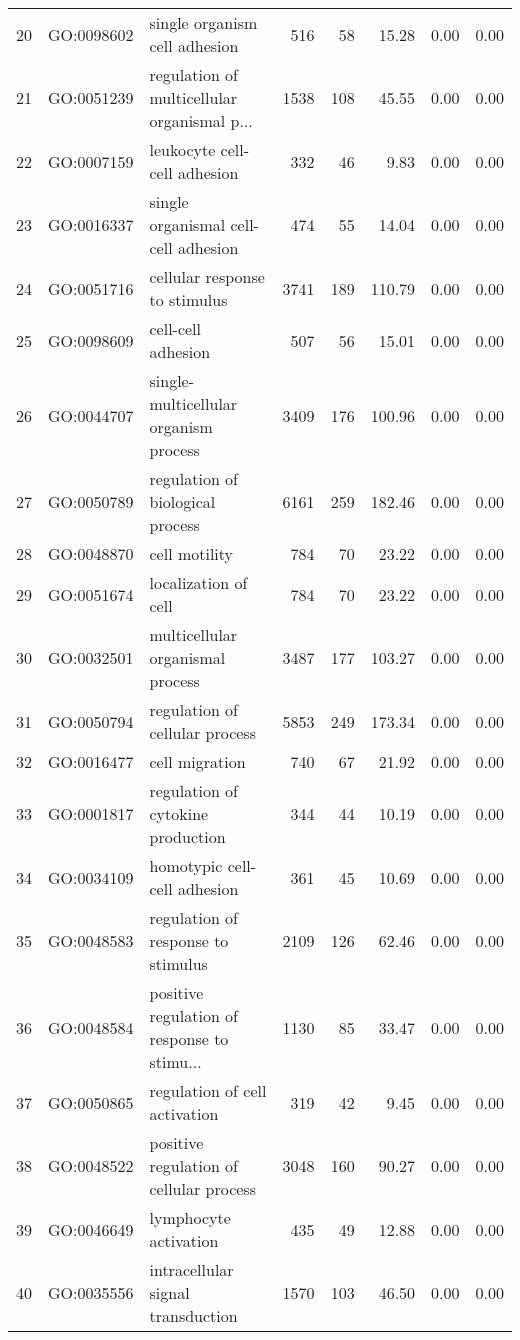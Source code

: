 \begin{table}[ht]
\begin{tabular}{rllrrrrr}
  20 & GO:0098602 & single organism cell adhesion & 516 &  58 & 15.28 & 0.00 & 0.00 \\ 
  21 & GO:0051239 & regulation of multicellular organismal p... & 1538 & 108 & 45.55 & 0.00 & 0.00 \\ 
  22 & GO:0007159 & leukocyte cell-cell adhesion & 332 &  46 & 9.83 & 0.00 & 0.00 \\ 
  23 & GO:0016337 & single organismal cell-cell adhesion & 474 &  55 & 14.04 & 0.00 & 0.00 \\ 
  24 & GO:0051716 & cellular response to stimulus & 3741 & 189 & 110.79 & 0.00 & 0.00 \\ 
  25 & GO:0098609 & cell-cell adhesion & 507 &  56 & 15.01 & 0.00 & 0.00 \\ 
  26 & GO:0044707 & single-multicellular organism process & 3409 & 176 & 100.96 & 0.00 & 0.00 \\ 
  27 & GO:0050789 & regulation of biological process & 6161 & 259 & 182.46 & 0.00 & 0.00 \\ 
  28 & GO:0048870 & cell motility & 784 &  70 & 23.22 & 0.00 & 0.00 \\ 
  29 & GO:0051674 & localization of cell & 784 &  70 & 23.22 & 0.00 & 0.00 \\ 
  30 & GO:0032501 & multicellular organismal process & 3487 & 177 & 103.27 & 0.00 & 0.00 \\ 
  31 & GO:0050794 & regulation of cellular process & 5853 & 249 & 173.34 & 0.00 & 0.00 \\ 
  32 & GO:0016477 & cell migration & 740 &  67 & 21.92 & 0.00 & 0.00 \\ 
  33 & GO:0001817 & regulation of cytokine production & 344 &  44 & 10.19 & 0.00 & 0.00 \\ 
  34 & GO:0034109 & homotypic cell-cell adhesion & 361 &  45 & 10.69 & 0.00 & 0.00 \\ 
  35 & GO:0048583 & regulation of response to stimulus & 2109 & 126 & 62.46 & 0.00 & 0.00 \\ 
  36 & GO:0048584 & positive regulation of response to stimu... & 1130 &  85 & 33.47 & 0.00 & 0.00 \\ 
  37 & GO:0050865 & regulation of cell activation & 319 &  42 & 9.45 & 0.00 & 0.00 \\ 
  38 & GO:0048522 & positive regulation of cellular process & 3048 & 160 & 90.27 & 0.00 & 0.00 \\ 
  39 & GO:0046649 & lymphocyte activation & 435 &  49 & 12.88 & 0.00 & 0.00 \\ 
  40 & GO:0035556 & intracellular signal transduction & 1570 & 103 & 46.50 & 0.00 & 0.00 \\ 

\end{tabular}
\end{table}
